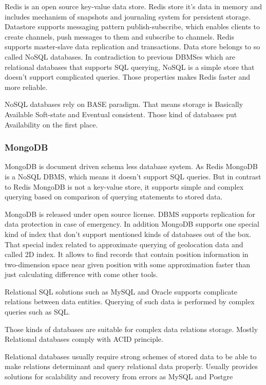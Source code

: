 \documentclass[thesis=M,english]{FITthesis}[2012/10/20]
\begin{document}
Redis is an open source key-value data store. Redis store it's data in memory and includes mechanism of snapshots and journaling system for persistent storage. Datastore supports messaging pattern publish-subscribe, which enables clients to create channels, push messages to them and  subscribe to channels.
Redis supports master-slave data replication and transactions. Data store belongs to so called NoSQL databases. In contradiction to previous DBMSes which are relational databases that supports SQL querying, NoSQL is a simple store that doesn't support complicated queries. Those properties makes Redis faster and more reliable.

NoSQL databases rely on BASE paradigm. That means storage is Basically Available Soft-state and Eventual consistent. Those kind of databases put Availability on the first place.

\subsubsection{MongoDB}

MongoDB is document driven schema less database system. As Redis MongoDB is a NoSQL DBMS, which means it doesn't support SQL queries. But in contrast to Redis MongoDB is not a key-value store, it supports simple and complex querying based on comparison of querying statements to stored data.

MongoDB is released under open source license. DBMS supports replication for data protection in case of emergency. 
In addition MongoDB supports one special kind of index that don't support mentioned kinds of databases out of the box. That special index related to approximate querying of geolocation data and called 2D index. It allows to find records that contain position information in two-dimension space near given position with some approximation faster than just calculating difference with come other tools.

Relational SQL solutions such as MySQL and Oracle supports complicate relations between data entities. Querying of such data is performed by complex queries such as SQL.

Those kinds of databases are suitable for complex data relations storage.
Mostly Relational databases comply with ACID principle.

Relational databases usually require strong schemes of stored data to be able to make relations determinant and query relational data properly.
Usually provides solutions for scalability and recovery from errors as MySQL and Postgre
\end{document}
